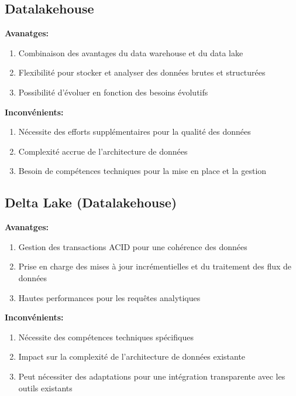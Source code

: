 \subsection{Datalakehouse}
\textbf{Avanatges:}
\begin{enumerate}
    \item Combinaison des avantages du data warehouse et du data lake
    \item Flexibilité pour stocker et analyser des données brutes et structurées
    \item Possibilité d'évoluer en fonction des besoins évolutifs
\end{enumerate}

\textbf{Inconvénients:}
\begin{enumerate}
    \item Nécessite des efforts supplémentaires pour la qualité des données
    \item Complexité accrue de l'architecture de données
    \item Besoin de compétences techniques pour la mise en place et la gestion
\end{enumerate}

\subsection{Delta Lake (Datalakehouse)}
\textbf{Avanatges:}
\begin{enumerate}
    \item Gestion des transactions ACID pour une cohérence des données
    \item Prise en charge des mises à jour incrémentielles et du traitement des flux de données
    \item Hautes performances pour les requêtes analytiques
\end{enumerate}

\textbf{Inconvénients:}
\begin{enumerate}
    \item Nécessite des compétences techniques spécifiques
    \item Impact sur la complexité de l'architecture de données existante
    \item Peut nécessiter des adaptations pour une intégration transparente avec les outils existants
\end{enumerate}


